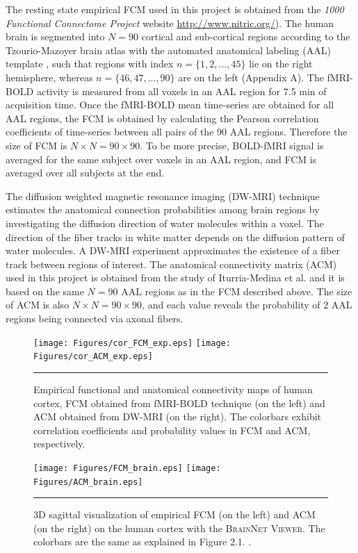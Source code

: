 The resting state empirical FCM used in this project is obtained from the \textit{1000 Functional Connectome Project} website \url{http://www.nitric.org/}). The human brain is segmented into $N=90$ cortical and sub-cortical regions according to the Tzourio-Mazoyer brain atlas with the automated anatomical labeling (AAL) template  \citep{TZO02}, such that regions with index $n=\{1,2,...,45\}$ lie on the right hemisphere, whereas $n=\{46,47,...,90\}$ are on the left (Appendix A). The fMRI-BOLD activity is measured from all voxels in an AAL region for 7.5 min of acquisition time. Once the fMRI-BOLD mean time-series are obtained for all AAL regions, the FCM is obtained by calculating the Pearson correlation coefficients of time-series between all pairs of the 90 AAL regions. Therefore the size of FCM is $N\times N = 90 \times 90$.  To be more precise, BOLD-fMRI signal is averaged for the same subject over voxels in an AAL region, and FCM is averaged over all subjects at the end. 

The diffusion weighted magnetic resonance imaging (DW-MRI) technique estimates the anatomical connection probabilities among brain regions by investigating the diffusion direction of water molecules within a voxel. The direction of the fiber tracks in white matter depends on the diffusion pattern of water molecules. A DW-MRI experiment approximates the existence of a fiber track between regions of interest. The anatomical connectivity matrix (ACM) used in this project is obtained from the study of Iturria-Medina et al. \citep{ITU08} and it is based on the same $N=90$ AAL regions as in the FCM described above. The size of ACM is also $N\times N = 90\times 90$, and each value reveals the probability of 2 AAL regions being connected via axonal fibers. 
  
\begin{figure}[htbp]
 
  \centering
	 \texttt{[image: Figures/cor\_FCM\_exp.eps]} 
	 \texttt{[image: Figures/cor\_ACM\_exp.eps]} 
	
    \rule{35em}{0.5pt}
  \caption[Empirical FCM and ACM]{Empirical functional and anatomical connectivity maps of human cortex, FCM obtained from fMRI-BOLD technique (on the left) and ACM obtained from DW-MRI (on the right). The colorbars exhibit correlation coefficients and probability values in FCM and ACM, respectively. }
  \label{fig:Empirical FCM and ACM}
 	
\end{figure}  

 
\begin{figure}[htbp]
 
  \centering
	 \texttt{[image: Figures/FCM\_brain.eps]} 
	 \texttt{[image: Figures/ACM\_brain.eps]} 
    \rule{35em}{0.5pt}
  \caption[Empirical FCM and ACM in cortex]{3D sagittal visualization of empirical FCM (on the left) and ACM (on the right) on the human cortex with the \textsc{BrainNet Viewer}. The colorbars are the same as explained in Figure 2.1. \citep{XYZ13}. } 
  \label{fig:Empirical FCM and ACM in cortex}
 	
\end{figure} 

